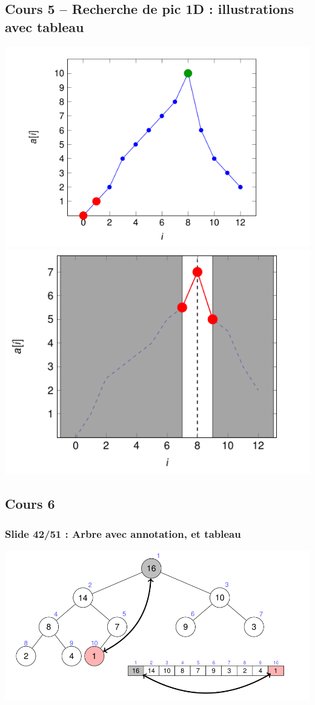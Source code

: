 \documentclass[12pt, a4paper]{article}
\begin{document}
\subsection{Cours 5 -- Recherche de pic 1D : illustrations avec tableau}
\begin{center}
\includegraphics[scale=0.3]{images/INFO-H304_C5_1}
\includegraphics[scale=0.3]{images/INFO-H304_C5_2}
\end{center}
\subsection{Cours 6}
\subsubsection{Slide 42/51 : Arbre avec annotation, et tableau}
\begin{center}
\includegraphics[scale=0.3]{images/INFO-H304_C6_1}
\end{center}
\end{document}
